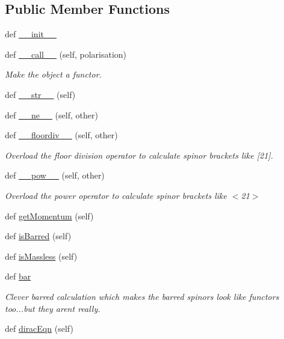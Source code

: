 \subsection*{Public Member Functions}
\begin{DoxyCompactItemize}
\item 
def \hyperlink{class_py_spinor_1_1_spinor_1_1_spinor_a9b056b1d6a909bc378dfed5375eeb961}{\+\_\+\+\_\+init\+\_\+\+\_\+}
\item 
def \hyperlink{class_py_spinor_1_1_spinor_1_1_spinor_a3bd7138871861b01b8206982230c63ed}{\+\_\+\+\_\+call\+\_\+\+\_\+} (self, polarisation)
\begin{DoxyCompactList}\small\item\em Make the object a functor. \end{DoxyCompactList}\item 
def \hyperlink{class_py_spinor_1_1_spinor_1_1_spinor_ad5401a5668ab41cff0f76cc270ed96d1}{\+\_\+\+\_\+str\+\_\+\+\_\+} (self)
\item 
def \hyperlink{class_py_spinor_1_1_spinor_1_1_spinor_ad48c01a28f221b81c913bf2fbf2cea6d}{\+\_\+\+\_\+ne\+\_\+\+\_\+} (self, other)
\item 
def \hyperlink{class_py_spinor_1_1_spinor_1_1_spinor_ab3bdf966caa2b922ba9ac76952701ee9}{\+\_\+\+\_\+floordiv\+\_\+\+\_\+} (self, other)
\begin{DoxyCompactList}\small\item\em Overload the floor division operator to calculate spinor brackets like \mbox{[}21\mbox{]}. \end{DoxyCompactList}\item 
def \hyperlink{class_py_spinor_1_1_spinor_1_1_spinor_a26eed6b4fd1bfeee0974afbaefd02e40}{\+\_\+\+\_\+pow\+\_\+\+\_\+} (self, other)
\begin{DoxyCompactList}\small\item\em Overload the power operator to calculate spinor brackets like $<$21$>$ \end{DoxyCompactList}\item 
def \hyperlink{class_py_spinor_1_1_spinor_1_1_spinor_ab4a660f4882baa072d3c06845fae9fa7}{get\+Momentum} (self)
\item 
def \hyperlink{class_py_spinor_1_1_spinor_1_1_spinor_a429c47acf609aee5dd41aa580e688de4}{is\+Barred} (self)
\item 
def \hyperlink{class_py_spinor_1_1_spinor_1_1_spinor_abea59fee1e79b530008e25f7e43e737b}{is\+Massless} (self)
\item 
def \hyperlink{class_py_spinor_1_1_spinor_1_1_spinor_ad1202b23d67450b5d097fa5984f4972e}{bar}
\begin{DoxyCompactList}\small\item\em Clever barred calculation which makes the barred spinors look like functors too...but they arent really. \end{DoxyCompactList}\item 
def \hyperlink{class_py_spinor_1_1_spinor_1_1_spinor_a561a2bbb23e5f44bd04a68065da6cced}{dirac\+Eqn} (self)
\end{DoxyCompactItemize}
